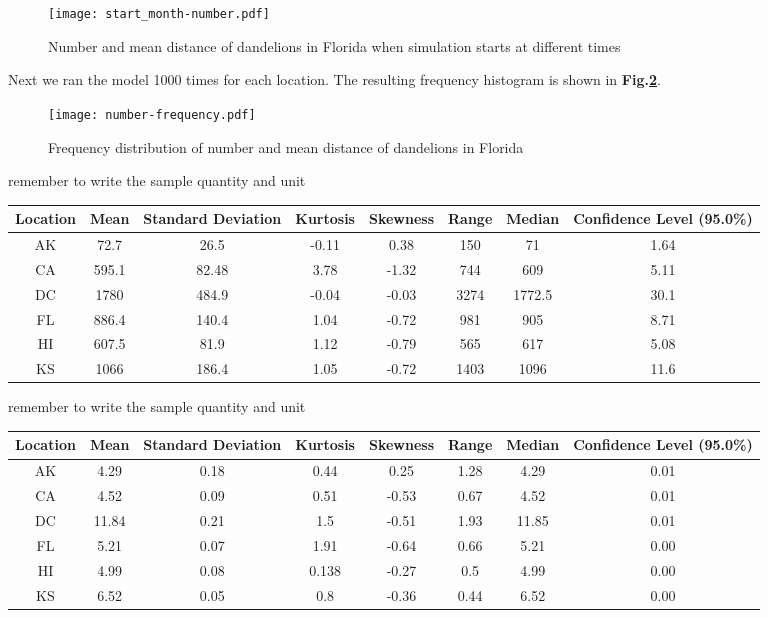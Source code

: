 \documentclass[12pt]{article}
\begin{document}
			\begin{figure}
				\centering
				\texttt{[image: start\_month-number.pdf]}
				\caption{Number and mean distance of dandelions in Florida when simulation starts at different times}
				\label{fig:start}
			\end{figure}
			
			Next we ran the model 1000 times for each location.  The resulting frequency histogram is shown in \textbf{Fig.\ref{fig:freqDand}}.  
			
			\begin{figure}
				\centering
				\texttt{[image: number-frequency.pdf]}
				\caption{Frequency distribution of number and mean distance of dandelions in Florida}
				\label{fig:freqDand}
			\end{figure}
			
			remember to write the sample quantity and unit \\
			
			{
				\fontsize{10}{14}\selectfont
				{
					\begin{longtable}{cccccccc}
						\toprule
						Location&Mean&Standard Deviation&Kurtosis&Skewness&Range&Median&Confidence Level (95.0\%)\\
						\toprule
						AK&72.7&26.5&-0.11&0.38&150&71&1.64\\
						CA&595.1&82.48&3.78&-1.32&744&609&5.11\\
						DC&1780&484.9&-0.04&-0.03&3274&1772.5&30.1\\
						FL&886.4&140.4&1.04&-0.72&981&905&8.71\\
						HI&607.5&81.9&1.12&-0.79&565&617&5.08\\
						KS&1066&186.4&1.05&-0.72&1403&1096&11.6\\
						\bottomrule
					\end{longtable}
				}
			}
			
			remember to write the sample quantity and unit \\
			
			{
				\fontsize{10}{14}\selectfont
				{
					\begin{longtable}{cccccccc}
						\toprule
						Location&Mean&Standard Deviation&Kurtosis&Skewness&Range&Median&Confidence Level (95.0\%)\\
						\toprule
						AK&4.29&0.18&0.44&0.25&1.28&4.29&0.01\\
						CA&4.52&0.09&0.51&-0.53&0.67&4.52&0.01\\
						DC&11.84&0.21&1.5&-0.51&1.93&11.85&0.01\\
						FL&5.21&0.07&1.91&-0.64&0.66&5.21&0.00\\
						HI&4.99&0.08&0.138&-0.27&0.5&4.99&0.00\\
						KS&6.52&0.05&0.8&-0.36&0.44&6.52&0.00\\
						\bottomrule
					\end{longtable}
				}
			}
			
\end{document}
